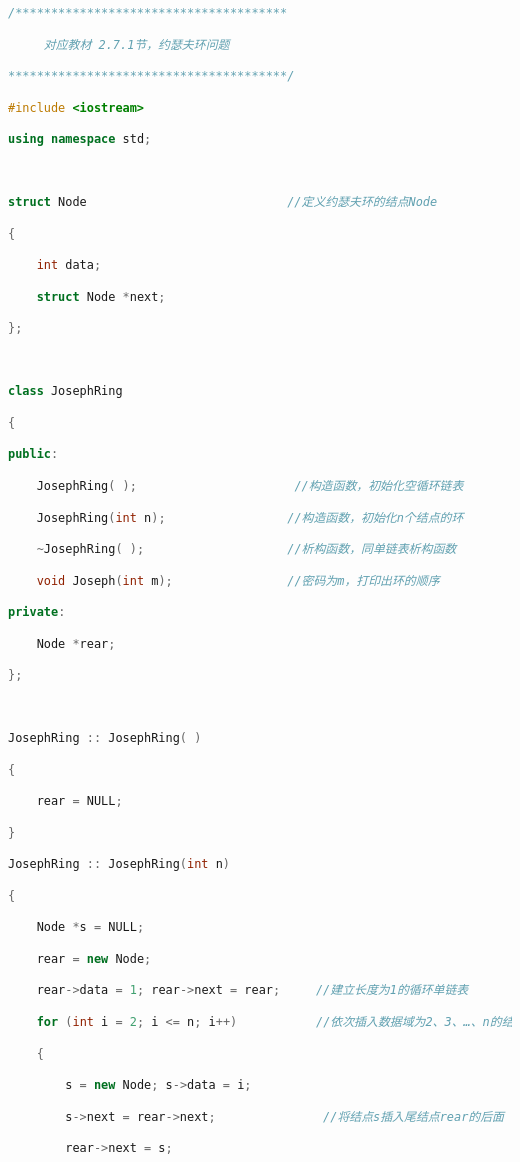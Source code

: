 \begin{lstlisting}[language=C++]
/**************************************

     对应教材 2.7.1节，约瑟夫环问题

***************************************/

#include <iostream>              

using namespace std;

  

struct Node                            //定义约瑟夫环的结点Node

{

    int data;

    struct Node *next;

};

  

class JosephRing

{

public:

    JosephRing( );                      //构造函数，初始化空循环链表

    JosephRing(int n);                 //构造函数，初始化n个结点的环

    ~JosephRing( );                    //析构函数，同单链表析构函数

    void Joseph(int m);                //密码为m，打印出环的顺序

private:

    Node *rear;

};

  

JosephRing :: JosephRing( )

{

    rear = NULL;

}

JosephRing :: JosephRing(int n)                            

{

    Node *s = NULL;  

    rear = new Node;    

    rear->data = 1; rear->next = rear;     //建立长度为1的循环单链表

    for (int i = 2; i <= n; i++)           //依次插入数据域为2、3、…、n的结点

    {

        s = new Node; s->data = i;

        s->next = rear->next;               //将结点s插入尾结点rear的后面

        rear->next = s;


\end{lstlisting}

